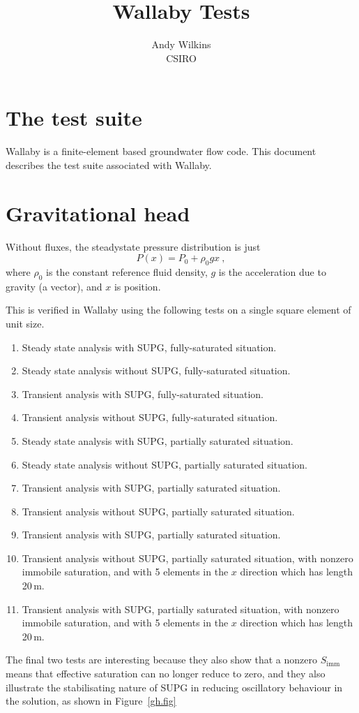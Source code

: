 \documentclass[]{scrreprt}
\begin{document}
\title{Wallaby Tests}
\author{Andy Wilkins \\
CSIRO}
\maketitle

\tableofcontents

\chapter{The test suite}

Wallaby is a finite-element based groundwater flow code.  This
document describes the test suite associated with Wallaby.

\chapter{Gravitational head}

Without fluxes, the steadystate pressure distribution is just
\begin{equation}
P(x) = P_{0} + \rho_{0} g x \ ,
\end{equation}
where $\rho_{0}$ is the constant reference fluid density, $g$ is the
acceleration due to gravity (a vector), and $x$ is position.  

This is verified in Wallaby using the following tests on a single
square element of unit size.
\begin{enumerate}
\item Steady state analysis with SUPG, fully-saturated situation.
\item Steady state analysis without SUPG, fully-saturated situation.
\item Transient analysis with SUPG, fully-saturated situation.
\item Transient analysis without SUPG, fully-saturated situation.
\item Steady state analysis with SUPG, partially saturated situation.
\item Steady state analysis without SUPG, partially saturated situation.
\item Transient analysis with SUPG, partially saturated situation.
\item Transient analysis without SUPG, partially saturated situation.
\item Transient analysis with SUPG, partially saturated situation.
\item Transient analysis without SUPG, partially saturated situation,
  with nonzero immobile saturation, and with 5 elements in the $x$
  direction which has length 20\,m.
\item Transient analysis with SUPG, partially saturated situation,
  with nonzero immobile saturation, and with 5 elements in the $x$
  direction which has length 20\,m.
\end{enumerate}
The final two tests are interesting because they also show that a
nonzero $S_{\mathrm{imm}}$ means that effective saturation can no
longer reduce to zero, and they also illustrate the stabilisating
nature of SUPG in reducing oscillatory behaviour in the solution, as
shown in Figure~\ref{gh.fig}
\end{document}
